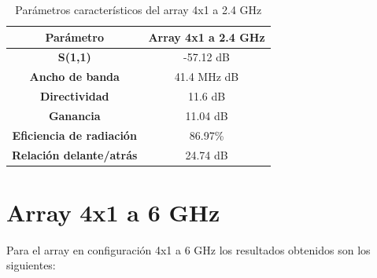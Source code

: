 \begin{table}[H]
  
   
   \small %
   \centering %
   \begin{tabular}{c c} %
   \toprule[\heavyrulewidth]\toprule[\heavyrulewidth]
   \textbf{Parámetro} & \textbf{Array 4x1 a 2.4 GHz} \\ 
   \midrule
   \textbf{S(1,1)} & -57.12 dB \\
   \textbf{Ancho de banda} & 41.4 MHz dB \\
   \textbf{Directividad} & 11.6 dB \\
   \textbf{Ganancia} & 11.04 dB \\
   \textbf{Eficiencia de radiación} & 86.97\% \\
   \textbf{Relación delante/atrás} & 24.74 dB \\

   \bottomrule[\heavyrulewidth] 
   \end{tabular}
   
   \caption{Parámetros característicos del array 4x1 a 2.4 GHz} 
   \label{tab:res4x11}
\end{table}




















\newpage
\section{Array 4x1 a 6 GHz}
\par Para el array en configuración 4x1 a 6 GHz los resultados obtenidos son los siguientes:

